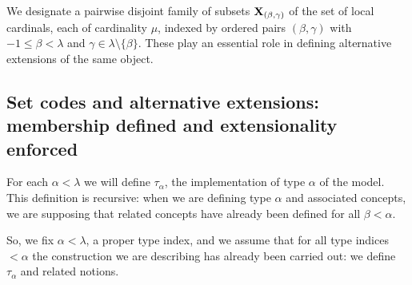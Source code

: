\documentclass[112pt]{article}
\begin{document}
We designate a pairwise disjoint family of subsets ${\bf X}_{(\beta,\gamma)}$ of the set of local cardinals, each of cardinality $\mu$, indexed by ordered pairs $(\beta,\gamma)$ with $-1 \leq \beta <\lambda$ and $\gamma \in \lambda \setminus \{\beta\}$.  These play an essential role in defining alternative extensions of the same object.

\subsection{Set codes and alternative extensions:  membership defined and extensionality enforced}


For each $\alpha<\lambda$ we will define $\tau_{\alpha}$, the implementation of type $\alpha$ of the model.  This definition is recursive:  when we are defining type $\alpha$ and associated concepts, we are supposing that related concepts have already been defined for all $\beta<\alpha$.

So, we fix $\alpha<\lambda$, a proper type index, and we assume that for all type indices $<\alpha$ the construction we are describing has already been carried out:  we define $\tau_\alpha$ and related notions.
\end{document}
